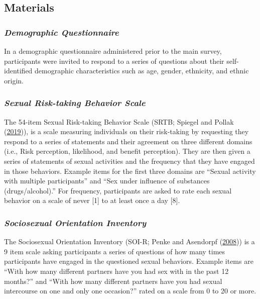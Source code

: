 \documentclass[
  donotrepeattitle,doc, 12pt, a4paper,floatsintext]{apa7}
\begin{document}
\hypertarget{materials-3}{%
\subsection{Materials}\label{materials-3}}

\hypertarget{demographic-questionnaire-3}{%
\subsubsection{\texorpdfstring{\emph{Demographic Questionnaire}}{Demographic Questionnaire}}\label{demographic-questionnaire-3}}

In a demographic questionnaire administered prior to the main survey, participants were invited to respond to a series of questions about their self-identified demographic characteristics such as age, gender, ethnicity, and ethnic origin.

\hypertarget{sexual-risk-taking-behavior-scale}{%
\subsubsection{\texorpdfstring{\emph{Sexual Risk-taking Behavior Scale}}{Sexual Risk-taking Behavior Scale}}\label{sexual-risk-taking-behavior-scale}}

The 54-item Sexual Risk-taking Behavior Scale (SRTB; Spiegel and Pollak (\protect\hyperlink{ref-spiegel2019}{2019})), is a scale measuring individuals on their risk-taking by requesting they respond to a series of statements and their agreement on three different domains (i.e., Risk perception, likelihood, and benefit perception). They are then given a series of statements of sexual activities and the frequency that they have engaged in those behaviors. Example items for the first three domains are ``Sexual activity with multiple participants'' and ``Sex under influence of substances (drugs/alcohol).'' For frequency, participants are asked to rate each sexual behavior on a scale of never {[}1{]} to at least once a day {[}8{]}.

\hypertarget{sociosexual-orientation-inventory}{%
\subsubsection{\texorpdfstring{\emph{Sociosexual Orientation Inventory}}{Sociosexual Orientation Inventory}}\label{sociosexual-orientation-inventory}}

The Sociosexual Orientation Inventory (SOI-R; Penke and Asendorpf (\protect\hyperlink{ref-penke2008}{2008})) is a 9 item scale asking participants a series of questions of how many times participants have engaged in the questioned sexual behaviors. Example items are ``With how many different partners have you had sex with in the past 12 months?'' and ``With how many different partners have you had sexual intercourse on one and only one occasion?'' rated on a scale from 0 to 20 or more.
\end{document}
